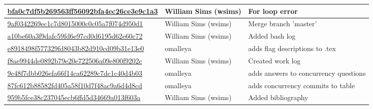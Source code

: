 \documentclass[10pt,letterpaper,draftclsnofoot,onecolumn]{IEEEtran}
\begin{document}
\begin{center}
\begin{tabular}{ | p{8cm} | p{3cm} | p{6cm} |}
    \href{https://github.com/omalleya/cs444-concurrency-writeups/commit/bfa0c7df5b269563ff56092bfa4ec26ce3e9c1a3}{bfa0c7df5b269563ff56092bfa4ec26ce3e9c1a3} & William Sims (wsims) & For loop error \\ \hline
    \href{https://github.com/omalleya/cs444-concurrency-writeups/commit/9af0342269ec1c7d8015000c0c05a7f074d950d1}{9af0342269ec1c7d8015000c0c05a7f074d950d1} & William Sims (wsims) & Merge branch 'master' \\ \hline
    \href{https://github.com/omalleya/cs444-concurrency-writeups/commit/a10be60a3f9dafc59fd6e97cd0d6195d62e60c72}{a10be60a3f9dafc59fd6e97cd0d6195d62e60c72} & William Sims (wsims) & Added bash log \\ \hline
    \href{https://github.com/omalleya/cs444-concurrency-writeups/commit/e8918498f577329fd8043b82d910cd09b31e13e0}{e8918498f577329fd8043b82d910cd09b31e13e0} & omalleya & adds flag descriptions to .tex \\ \hline
    \href{https://github.com/omalleya/cs444-concurrency-writeups/commit/f8ae9944de0892b79e20e722506a09e800f9202c}{f8ae9944de0892b79e20e722506a09e800f9202c} & William Sims (wsims) & Created work log \\ \hline
    \href{https://github.com/omalleya/cs444-concurrency-writeups/commit/9e48f7dbb026efa66f14ca62289c7dc1c40d4b03}{9e48f7dbb026efa66f14ca62289c7dc1c40d4b03} & omalleya & adds answers to concurrency questions \\ \hline
    \href{https://github.com/omalleya/cs444-concurrency-writeups/commit/87fc612b88582fd405a58f10d7f48ac9a6d4d8cd}{87fc612b88582fd405a58f10d7f48ac9a6d4d8cd} & omalleya & adds concurrency commits to table \\ \hline
    \href{https://github.com/omalleya/cs444-concurrency-writeups/commit/959b5fce38c237045ecb6ffd5d34669a013f603a}{959b5fce38c237045ecb6ffd5d34669a013f603a} & William Sims (wsims) & Added bibliography \\ \hline
    \end{tabular}
\end{center}
\end{document}
